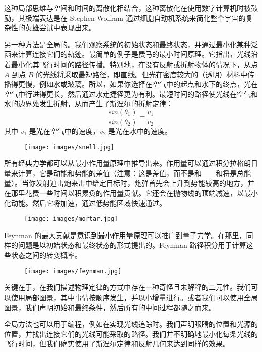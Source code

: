 这种局部思维与空间和时间的离散化相结合，这种离散化在使用数字计算机时被鼓励，其极端表达是在 Stephen Wolfram 通过细胞自动机系统来简化整个宇宙的复杂性的英雄尝试中表现出来。

另一种方法是全局的。我们观察系统的初始状态和最终状态，并通过最小化某种泛函来计算连接它们的轨迹。最简单的例子是费马的最小时间原理。它指出，光线沿着最小化其飞行时间的路径传播。特别地，在没有反射或折射物体的情况下，从点 $A$ 到点 $B$ 的光线将采取最短路径，即直线。但光在密度较大的（透明）材料中传播得更慢，例如水或玻璃。所以，如果你选择在空气中的起点和水下的终点，光在空气中行进得更长，然后通过水走捷径更为有利。最短时间的路径使光线在空气和水的边界处发生折射，从而产生了斯涅尔的折射定律：
\begin{equation*}
  \frac{sin(\theta_1)}{sin(\theta_2)} = \frac{v_1}{v_2}
\end{equation*}
其中 $v_1$ 是光在空气中的速度，$v_2$ 是光在水中的速度。

\begin{figure}[H]
  \centering
  \texttt{[image: images/snell.jpg]}
\end{figure}

\noindent
所有经典力学都可以从最小作用量原理中推导出来。作用量可以通过积分拉格朗日量来计算，它是动能和势能的差值（注意：这是差值，而不是和——和将是总能量）。当你发射迫击炮来击中给定目标时，炮弹首先会上升到势能较高的地方，并在那里花费一些时间以积累负的作用量贡献。它还会在抛物线的顶端减速，以最小化动能。然后它将加速，通过低势能区域快速通过。

\begin{figure}[H]
  \centering
  \texttt{[image: images/mortar.jpg]}
\end{figure}

\noindent
Feynman 的最大贡献是意识到最小作用量原理可以推广到量子力学。在那里，同样的问题是以初始状态和最终状态的形式提出的。Feynman 路径积分用于计算这些状态之间的转变概率。

\begin{figure}[H]
  \centering
  \texttt{[image: images/feynman.jpg]}
\end{figure}

\noindent
关键在于，在我们描述物理定律的方式中存在一种奇怪且未解释的二元性。我们可以使用局部图景，其中事情按顺序发生，并以小增量进行。或者我们可以使用全局图景，我们声明初始和最终条件，然后所有的中间过程都随之而来。

全局方法也可以用于编程，例如在实现光线追踪时。我们声明眼睛的位置和光源的位置，并找出连接它们的光线可能采取的路径。我们并不明确地最小化每条光线的飞行时间，但我们确实使用了斯涅尔定律和反射几何来达到同样的效果。

